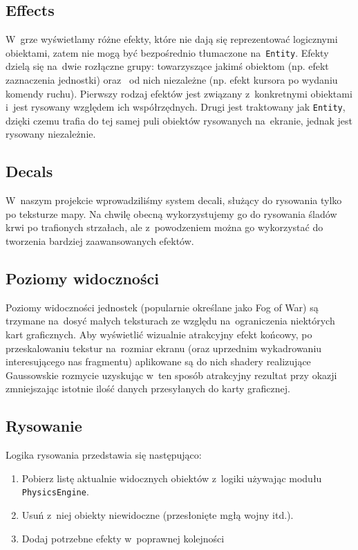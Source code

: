 \documentclass[licencjacka]{pracamgr}
\begin{document}
    \subsection{Effects}
      W~grze wyświetlamy różne efekty, które nie dają się reprezentować logicznymi obiektami, zatem nie mogą być bezpośrednio tłumaczone
      na~\texttt{Entity}. Efekty dzielą się na~dwie rozłączne grupy: towarzyszące jakimś obiektom (np. efekt zaznaczenia jednostki) oraz~
      od nich niezależne (np. efekt kursora po wydaniu komendy ruchu). Pierwszy rodzaj efektów jest związany z~konkretnymi obiektami i~jest
      rysowany względem ich współrzędnych. Drugi jest traktowany jak \texttt{Entity}, dzięki czemu trafia do tej samej puli obiektów rysowanych
      na~ekranie, jednak jest rysowany niezależnie.

    \subsection{Decals}
      W~naszym projekcie wprowadziliśmy system decali, służący do rysowania tylko po teksturze mapy. Na chwilę obecną wykorzystujemy go do
      rysowania śladów krwi po trafionych strzałach, ale z~powodzeniem można go wykorzystać do tworzenia bardziej zaawansowanych efektów.

    \subsection{Poziomy widoczności}
      Poziomy widoczności jednostek (popularnie określane jako Fog of War) są trzymane na~dosyć małych teksturach ze względu na~ograniczenia
      niektórych kart graficznych. Aby wyświetlić wizualnie atrakcyjny efekt końcowy, po przeskalowaniu tekstur na~rozmiar ekranu
      (oraz uprzednim wykadrowaniu interesującego nas fragmentu) aplikowane są do nich shadery realizujące Gaussowskie rozmycie\cite{GB}
      uzyskując w~ten sposób atrakcyjny rezultat przy okazji zmniejszając istotnie ilość danych przesyłanych do karty graficznej.

    \subsection{Rysowanie}
      Logika rysowania przedstawia się następująco:
      \begin{enumerate}
       \item Pobierz listę aktualnie widocznych obiektów z~logiki używając modułu \texttt{PhysicsEngine}.
       \item Usuń z~niej obiekty niewidoczne (przesłonięte mgłą wojny itd.).
       \item Dodaj potrzebne efekty w~poprawnej kolejności
      \end{enumerate}
\end{document}
